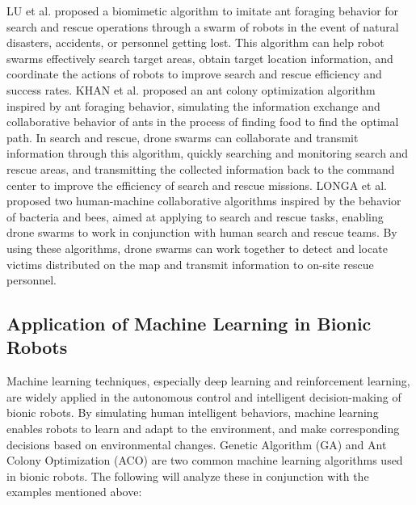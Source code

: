 \documentclass[conference]{IEEEtran}
\begin{document}
LU \cite{b47} et al. proposed a biomimetic algorithm to imitate ant foraging behavior for search and rescue operations through a swarm of robots in the event of natural disasters, accidents, or personnel getting lost. This algorithm can help robot swarms effectively search target areas, obtain target location information, and coordinate the actions of robots to improve search and rescue efficiency and success rates. KHAN et al. \cite{b48} proposed an ant colony optimization algorithm inspired by ant foraging behavior, simulating the information exchange and collaborative behavior of ants in the process of finding food to find the optimal path. In search and rescue, drone swarms can collaborate and transmit information through this algorithm, quickly searching and monitoring search and rescue areas, and transmitting the collected information back to the command center to improve the efficiency of search and rescue missions. LONGA et al. \cite{b49} proposed two human-machine collaborative algorithms inspired by the behavior of bacteria and bees, aimed at applying to search and rescue tasks, enabling drone swarms to work in conjunction with human search and rescue teams. By using these algorithms, drone swarms can work together to detect and locate victims distributed on the map and transmit information to on-site rescue personnel.


\subsection{Application of Machine Learning in Bionic Robots}
Machine learning techniques, especially deep learning and reinforcement learning, are widely applied in the autonomous control and intelligent decision-making of bionic robots. By simulating human intelligent behaviors, machine learning enables robots to learn and adapt to the environment, and make corresponding decisions based on environmental changes. Genetic Algorithm (GA) and Ant Colony Optimization (ACO) are two common machine learning algorithms used in bionic robots. The following will analyze these in conjunction with the examples mentioned above:
\end{document}
